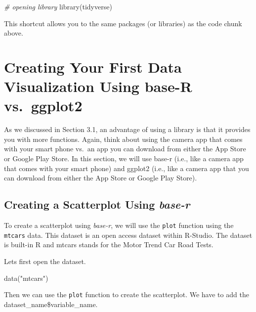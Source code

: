 \documentclass[
]{book}
\newenvironment{Shaded}{\begin{snugshade}}{\end{snugshade}}
\newcommand{\CommentTok}[1]{\textcolor[rgb]{0.56,0.35,0.01}{\textit{#1}}}
\newcommand{\FunctionTok}[1]{\textcolor[rgb]{0.00,0.00,0.00}{#1}}
\newcommand{\NormalTok}[1]{#1}
\newcommand{\StringTok}[1]{\textcolor[rgb]{0.31,0.60,0.02}{#1}}
\begin{document}
\begin{Shaded}
\begin{Highlighting}[]
\CommentTok{\# opening library}
\FunctionTok{library}\NormalTok{(tidyverse)}
\end{Highlighting}
\end{Shaded}

This shortcut allows you to the same packages (or libraries) as the code chunk above.

\hypertarget{creating-your-first-data-visualization-using-base-r-vs.-ggplot2}{%
\section{Creating Your First Data Visualization Using base-R vs.~ggplot2}\label{creating-your-first-data-visualization-using-base-r-vs.-ggplot2}}

As we discussed in Section 3.1, an advantage of using a library is that it provides you with more functions. Again, think about using the camera app that comes with your smart phone vs.~an app you can download from either the App Store or Google Play Store. In this section, we will use base-r (i.e., like a camera app that comes with your smart phone) and ggplot2 (i.e., like a camera app that you can download from either the App Store or Google Play Store).

\hypertarget{creating-a-scatterplot-using-base-r}{%
\subsection{\texorpdfstring{Creating a Scatterplot Using \emph{base-r}}{Creating a Scatterplot Using base-r}}\label{creating-a-scatterplot-using-base-r}}

To create a scatterplot using \emph{base-r}, we will use the \texttt{plot} function using the \texttt{mtcars} data. This dataset is an open access dataset within R-Studio. The dataset is built-in R and mtcars stands for the Motor Trend Car Road Tests.

Lets first open the dataset.

\begin{Shaded}
\begin{Highlighting}[]
\FunctionTok{data}\NormalTok{(}\StringTok{"mtcars"}\NormalTok{)}
\end{Highlighting}
\end{Shaded}

Then we can use the \texttt{plot} function to create the scatterplot. We have to add the dataset\_name\$variable\_name.
\end{document}
